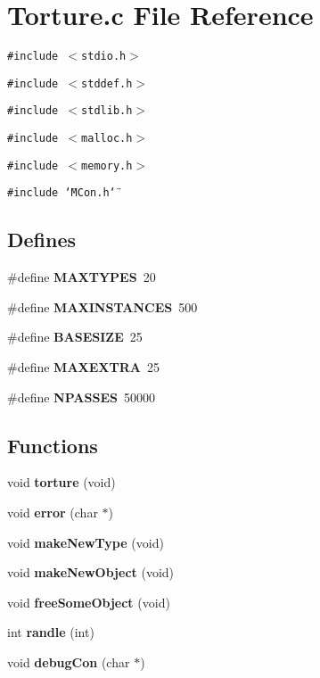\section{Torture.c File Reference}
\label{Torture_8c}
{\tt \#include $<$stdio.h$>$}\par
{\tt \#include $<$stddef.h$>$}\par
{\tt \#include $<$stdlib.h$>$}\par
{\tt \#include $<$malloc.h$>$}\par
{\tt \#include $<$memory.h$>$}\par
{\tt \#include \char`\"{}MCon.h\char`\"{}}\par
\subsection*{Defines}
\begin{CompactItemize}
\item 
\#define {\bf MAXTYPES}\ 20
\item 
\#define {\bf MAXINSTANCES}\ 500
\item 
\#define {\bf BASESIZE}\ 25
\item 
\#define {\bf MAXEXTRA}\ 25
\item 
\#define {\bf NPASSES}\ 50000
\end{CompactItemize}
\subsection*{Functions}
\begin{CompactItemize}
\item 
void {\bf torture} (void)
\item 
void {\bf error} (char $\ast$)
\item 
void {\bf make\-New\-Type} (void)
\item 
void {\bf make\-New\-Object} (void)
\item 
void {\bf free\-Some\-Object} (void)
\item 
int {\bf randle} (int)
\item 
void {\bf debug\-Con} (char $\ast$)
\end{CompactItemize}

